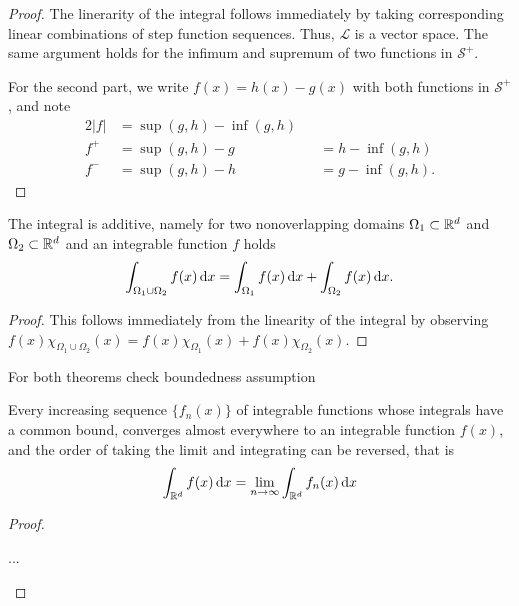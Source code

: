 \begin{proof}
  The linerarity of the integral follows immediately by taking
  corresponding linear combinations of step function sequences. Thus,
  $\mathcal L$ is a vector space. The same argument holds for the
  infimum and supremum of two functions in $\mathcal S^+$.

  For the second part, we write $f(x)=h(x)-g(x)$ with both functions
  in $\mathcal S^+$, and note
  \begin{alignat*}{2}
    |f| &= \sup(g,h) - \inf(g,h) \\
    f^+ &= \sup(g,h) - g &&= h - \inf(g,h) \\
    f^- &= \sup(g,h) - h &&= g - \inf(g,h).
  \end{alignat*}
\end{proof}


\begin{corollary}
  The integral is additive, namely for two nonoverlapping domains
  $\Omega_1\subset\mathbb R^d$ and $\Omega_2\subset\mathbb R^d$ and an integrable
  function $f$ holds
  \begin{gather*}
    \int_{\Omega_1\cup\Omega_2} f(x)\,\mathrm{d} x = \int_{\Omega_1} f(x)\,\mathrm{d} x + \int_{\Omega_2} f(x)\,\mathrm{d} x.
  \end{gather*}
\end{corollary}

\begin{proof}
  This follows immediately from the linearity of the integral by
  observing $f(x)\chi_{\Omega_1\cup\Omega_2}(x) =
  f(x)\chi_{\Omega_1}(x)+f(x)\chi_{\Omega_2}(x)$.
\end{proof}

\begin{todo}
  For both theorems check boundedness assumption
\end{todo}

\begin{theorem}
  Every increasing sequence $\{f_n(x)\}$ of integrable functions whose
  integrals have a common bound, converges almost everywhere to an
  integrable function $f(x)$, and the order of taking the limit and
  integrating can be reversed, that is
  \begin{gather}
    \int_{\mathbb R^d} f(x)\,\mathrm{d} x
    = \lim_{n\to\infty} \int_{\mathbb R^d} f_n(x)\,\mathrm{d} x
  \end{gather}
\end{theorem}

\begin{proof}
  \begin{todo}
    ...
  \end{todo}
\end{proof}


